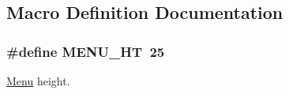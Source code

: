 \subsection{Macro Definition Documentation}
\hypertarget{molto-allegro_8cpp_a6074a5564c1d0d5ce23e8f15d64375e7}{
\subsubsection[{M\-E\-N\-U\-\_\-\-H\-T}]{\setlength{\rightskip}{0pt plus 5cm}\#define M\-E\-N\-U\-\_\-\-H\-T~25}}\label{molto-allegro_8cpp_a6074a5564c1d0d5ce23e8f15d64375e7}
\hyperlink{classMenu}{Menu} height. 
